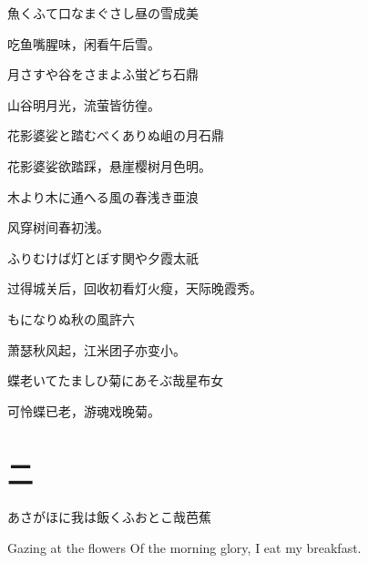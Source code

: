 \begin{haiku}
    {\FH 魚くふて口なまぐさし昼の雪}\hfill{\FH 成美}

    {\FK 吃鱼嘴腥味，闲看午后雪。}
\end{haiku}

\begin{haiku}
    {\FH 月さすや谷をさまよふ蛍どち}\hfill{\FH 石鼎}

    {\FK 山谷明月光，流萤皆彷徨。}
\end{haiku}

\begin{haiku}
    {\FH 花影婆娑と踏むべくありぬ岨の月}\hfill{\FH 石鼎}

    {\FK 花影婆娑欲踏踩，悬崖樱树月色明。}
\end{haiku}

\begin{haiku}
    {\FH 木より木に通へる風の春浅き}\hfill{\FH 亜浪}

    {\FK 风穿树间春初浅。}
\end{haiku}

\begin{haiku}
    {\FH ふりむけば灯とぼす関や夕霞}\hfill{\FH 太祇}

    {\FK 过得城关后，回收初看灯火瘦，天际晚霞秀。}
\end{haiku}

\begin{haiku}
    {\FH {}もになりぬ秋の風}\hfill{\FH 許六}

    {\FK 萧瑟秋风起，江米团子亦变小。}
\end{haiku}

\begin{haiku}
    {\FH 蝶老いてたましひ菊にあそぶ哉}\hfill{\FH 星布女}

    {\FK 可怜蝶已老，游魂戏晚菊。}
\end{haiku}

\chapter{\FK 二}
\setcounter{haikucounter}{0}

\begin{haiku}
    {\FH あさがほに我は飯くふおとこ哉}\hfill{\FH 芭蕉}

    \vin{} Gazing at the flowers
    \vin{} \vin{} Of the morning glory,
    \vin{} \vin{} \vin{} I eat my breakfast.
\end{haiku}

